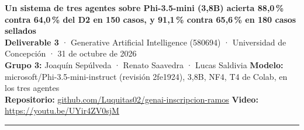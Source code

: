 \documentclass[9pt,a4paper]{extarticle}
\newcommand{\cod}[1]{{\ttfamily\small #1}}
\begin{document}
\raggedright

{\Large\bfseries Un sistema de tres agentes sobre Phi-3.5-mini (3,8B) acierta 88,0\,\% contra 64,0\,\% del D2 en 150 casos, y 91,1\,\% contra 65,6\,\% en 180 casos sellados}\\[0.8mm]
{\footnotesize\color{gris}%
\textbf{Deliverable 3} · Generative Artificial Intelligence (580694) · Universidad de Concepción · 31 de octubre de 2026\\
\textbf{Grupo 3:} Joaquín Sepúlveda · Renato Saavedra · Lucas Saldivia \quad\textbullet\quad
\textbf{Modelo:} \cod{microsoft/Phi-3.5-mini-instruct} (revisión \cod{2fe1924}), 3,8B, NF4, T4 de Colab, en los tres agentes\\
\textbf{Repositorio:} \href{https://github.com/Luquitas02/genai-inscripcion-ramos}{\cod{github.com/Luquitas02/genai-inscripcion-ramos}} \quad\textbullet\quad
\textbf{Video:} {\small\url{https://youtu.be/UYir4ZV0sjM}}}

\vspace{1mm}
{\color{linea}\rule{\textwidth}{0.4pt}}
\vspace{0.5mm}
\end{document}

